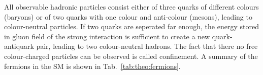 All observable hadronic particles consist either of three quarks of different colours (baryons) or of two quarks with one colour and anti-colour (mesons), leading to colour-neutral particles. If two quarks are seperated far enough, the energy stored in gluon field of the strong interaction is sufficient to create a new quark-antiquark pair, leading to two colour-neutral hadrons. The fact that there no free colour-charged particles can be observed is called confinement. A summary of the fermions in the SM is shown in Tab.~\ref{tab:theo:fermions}.\\
